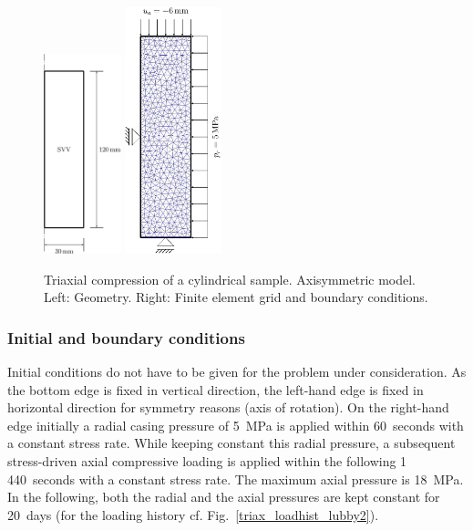 \begin{figure}[!htb]
\begin{center}
\includegraphics[width=0.2\textwidth]{M/figure/svv_model.eps}
\hspace*{10.0ex}
\includegraphics[width=0.25\textwidth]{M/figure/svv_mesh.eps}
\end{center}
\caption{Triaxial compression of a cylindrical sample. Axisymmetric model. Left: Geometry. Right: Finite element grid and boundary conditions.} 
\label{triax_model_lubby2}
\end{figure}

\subsubsection*{Initial and boundary conditions}

Initial conditions do not have to be given for the problem under consideration. As the bottom edge is fixed in vertical direction, the left-hand edge is fixed in horizontal direction for symmetry reasons (axis of rotation). On the right-hand edge initially a radial casing pressure of 5~MPa is applied within 60~seconds with a constant stress rate. While keeping constant this radial pressure, a subsequent stress-driven axial compressive loading is applied within the following 1\,440~seconds with a constant stress rate. The maximum axial pressure is 18~MPa. In the following, both the radial and the axial pressures are kept constant for 20~days (for the loading history cf. Fig.~\ref{triax_loadhist_lubby2}).

